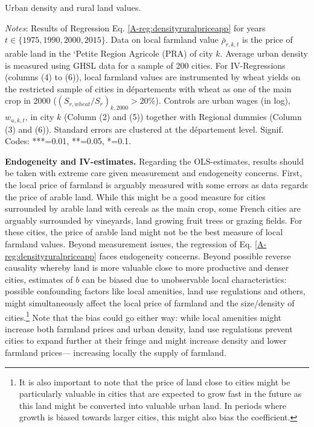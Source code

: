 \documentclass[11pt]{report}
\newcommand{\datatables}{../output/data/tables}
\begin{document}
\begin{table}[h!]
	\begin{center}
		
		\caption{Urban density and rural land values.\label{A-tab:densityruralpriceAPP}}
	\end{center}
	{\footnotesize \textit{Notes}: Results of Regression Eq. \ref{A-reg:densityruralpriceapp} for years $t \in \{1975, 1990, 2000, 2015\}$. Data on local farmland value $\bar{\rho}_{r,k,t}$ is the price of arable land in the `Petite Region Agricole (PRA) of city $k$.  Average urban density is measured using GHSL data for a sample of 200 cities. For IV-Regressions (columns (4) to (6)), local farmland values are instrumented by wheat yields on the restricted sample of cities in départements with wheat as one of the main crop in 2000 ($(S_{r,wheat}/S_r)_{k,2000}>20\%$). Controls are urban wages (in log), $w_{u,k,t}$, in city $k$ (Column (2) and (5)) together with Regional dummies (Column (3) and (6)). Standard errors are clustered at the département level. Signif. Codes: ***=0.01, **=0.05, *=0.1.}
\end{table}



\noindent \textbf{Endogeneity and IV-estimates.} Regarding the OLS-estimates, results should be taken with extreme care given measurement and endogeneity concerns. First, the local price of farmland is arguably measured with some errors as data regards the price of arable land. While this might be a good measure for cities surrounded by arable land with cereals as the main crop, some French cities are arguably surrounded by vineyards, land growing fruit trees or grazing fields. For these cities, the price of arable land might not be the best measure of local farmland values. Beyond measurement issues, the regression of Eq. \ref{A-reg:densityruralpriceapp} faces endogeneity concerns. Beyond possible reverse causality whereby land is more valuable close to more productive and denser cities, estimates of $b$ can be biased due to unobservable local characteristics: possible confounding factors like local amenities, land use regulations and others, might simultaneously affect the local price of farmland and the size/density of cities.\footnote{It is also important to note that the price of land close to cities might be particularly valuable in cities that are expected to grow fast in the future as this land might be converted into valuable urban land. In periods where growth is biased towards larger cities, this might also bias the coefficient.} Note that the bias could go either way: while local amenities might increase both farmland prices and urban density, land use regulations prevent cities to expand further at their fringe and might increase density and lower farmland prices--- increasing locally the supply of farmland.  
\end{document}
